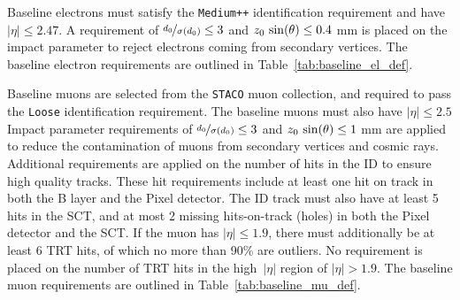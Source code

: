 Baseline electrons must satisfy the \texttt{Medium++} identification
requirement and have $|\eta| \leq 2.47$.
A requirement of $\nicefrac{d_0}{\sigma(d_0)} \leq 3$ and $z_0\,\sin(\theta) \leq 0.4$ mm
is placed on the impact parameter to reject electrons coming from secondary
vertices.
The baseline electron requirements are outlined in
Table~\ref{tab:baseline_el_def}.

\begin{table}[ht]
\caption{Baseline electron requirements.}
\label{tab:baseline_el_def}
\end{table}

Baseline muons are selected from the \texttt{STACO} muon collection, and
required to pass the \texttt{Loose} identification requirement. The baseline
muons must also have $|\eta| \leq 2.5$ 
Impact parameter requirements of $\nicefrac{d_0}{\sigma(d_0)} \leq 3$ and
$z_0\,\sin(\theta) \leq 1$ mm are applied to reduce the contamination of muons
from secondary vertices and cosmic rays.
Additional requirements are applied on the number of hits in the ID to ensure
high quality tracks.
These  hit requirements include at least one hit on track in both the B layer
and the Pixel detector.
The ID track must also have at least 5 hits in the SCT, and at most 2 missing 
hits-on-track (holes) in both the Pixel detector and the SCT. 
If the muon has $|\eta| \leq 1.9$, there must additionally be at least 6 TRT
hits, of which no more than 90\% are outliers.
No requirement is placed on the number of TRT hits in the high~$|\eta|$ region
of $|\eta| > 1.9$.
The baseline muon requirements are outlined in Table~\ref{tab:baseline_mu_def}.

